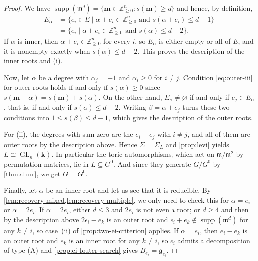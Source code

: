\documentclass[11pt,letterpaper,reqno]{amsart}
\theoremstyle{remark}
\theoremstyle{definition}
\def\M{\mathfrak{m}}
\newcommand{\KK}[0]{\ensuremath{\mathbf{k}}}
\newcommand{\ZZ}[0]{\ensuremath{\mathbb{Z}}}
\newcommand{\supp}[0]{\ensuremath{\operatorname{supp}}}
\newcommand{\GL}[0]{\ensuremath{\operatorname{GL}}}
\begin{document}
\begin{proof}
We have $\supp(\M^d)=\{\mathbf{m}\in\ZZ^n_{\geq0}: s(\mathbf{m})\geq d\}$ and hence, by definition,
\begin{align*}
E_\alpha &=\{e_i\in E\mid \alpha+e_i\in\ZZ^n_{\geq0}\text{ and } s(\alpha+e_i)\leq d-1\}\\
&=\{e_i\mid \alpha+e_i\in\ZZ^n_{\geq0}\text{ and } s(\alpha)\leq d-2\}.
\end{align*}
If $\alpha$ is inner, then $\alpha+e_i\in\ZZ^n_{\geq0}$ for every $i$, so $E_\alpha$ is
either empty or all of $E$, and it is nonempty exactly when $s(\alpha)\leq d-2$. This
proves the description of the inner roots and \textup{(i)}.

Now, let $\alpha$ be a degree with $\alpha_j=-1$ and $\alpha_i\geq0$ for $i\neq j$. Condition \eqref{eq:outer-iii} for outer roots holds if and only if $s(\alpha)\geq0$ since $s(\mathbf m+\alpha)=s(\mathbf m)+s(\alpha)$. On the other hand, $E_\alpha\neq\varnothing$ if and only if $e_j\in E_\alpha$, that is, if and only if $s(\alpha)\leq d-2$. Writing
$\beta=\alpha+e_j$ turns these two conditions into $1\leq s(\beta)\leq d-1$, which gives
the description of the outer roots.

For \textup{(ii)}, the degrees with sum zero are the $e_i-e_j$ with $i\neq j$, and all of them are outer roots by the description above. Hence
$\Sigma=\Sigma_L$ and \cref{prop:levi} yields $L\cong\GL_n(\KK)$. In particular the toric automorphisms, which act on $\M/\M^2$ by permutation matrices, lie in $L\subseteq G^0$. And since they generate $G/G^0$
by \cref{thm:dlmr}, we get $G=G^0$.

Finally, let $\alpha$ be an inner root and let us see that it is reducible. By \cref{lem:recovery-mixed,lem:recovery-multiple}, we only need to check this for $\alpha=e_i$ or $\alpha=2e_i$. If $\alpha=2e_i$, either $d\leq3$ and $2e_i$ is not even a root; or $d\geq 4$ and then by the description above $2e_i-e_k$ is an outer root and $e_i+e_k\notin\supp(\M^d)$ for any $k\neq i$, so case~\textup{(ii)} of \cref{prop:two-ei-criterion} applies. If $\alpha=e_i$, then $e_i-e_k$ is an outer root and $e_k$ is an inner root for any $k\neq i$, so $e_i$ admits a decomposition of type
\textup{(A)} and \cref{prop:ei-Iouter-search} gives $B_{e_i}=\mathfrak g_{e_i}$.
\end{proof}
\end{document}
